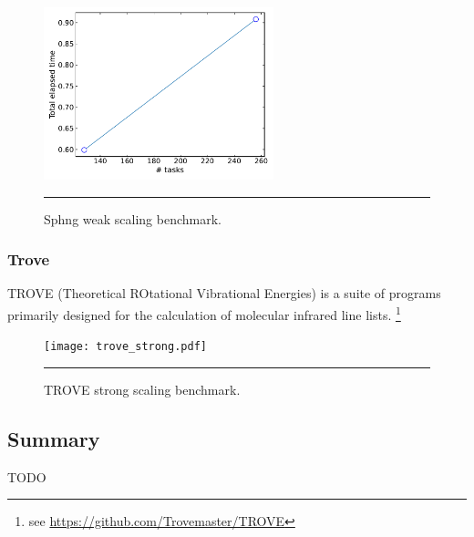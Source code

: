 \documentclass[10pt]{article}
\begin{document}
\begin{figure}[h!]
	\centering
	\includegraphics[height=5cm]{Sphng_weak.pdf}
	\vspace{0.1cm}
	\hrule
	\vspace{0.01cm}
	\caption{Sphng weak scaling benchmark.}
	\label{fig::sphng_ws}
\end{figure}


\clearpage
\subsubsection{Trove}
TROVE (Theoretical ROtational Vibrational Energies) is a suite of programs
primarily designed for the calculation of molecular infrared line lists.
\footnote{see \url{https://github.com/Trovemaster/TROVE}}


\begin{figure}[h!]
	\centering
	\texttt{[image: trove\_strong.pdf]}
	\vspace{0.1cm}
	\hrule
	\vspace{0.01cm}
	\caption{TROVE strong scaling benchmark.}
	\label{fig::trove_ss}
\end{figure}


\clearpage
\subsection{Summary}

{\color{red} TODO}
\end{document}
